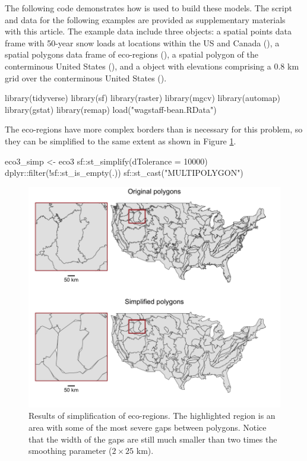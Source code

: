 The following code demonstrates how  is used to build these models. The script and data for the following examples are provided as supplementary materials with this article. The example data include three  objects: a spatial points data frame with 50-year snow loads at locations within the US and Canada (), a spatial polygons data frame of eco-regions (), a spatial polygon of the conterminous United States (), and a  object with elevations comprising a 0.8 km grid over the conterminous United States ().

\begin{example}
library(tidyverse)
library(sf)
library(raster)
library(mgcv)
library(automap)
library(gstat)
library(remap)
load("wagstaff-bean.RData")
\end{example}

The eco-regions have more complex borders than is necessary for this problem, so they can be simplified to the same extent as shown in Figure \ref{fig:simplification}.

\begin{example}
eco3_simp <- eco3 %
  sf::st_simplify(dTolerance = 10000) %
  dplyr::filter(!sf::st_is_empty(.)) %
  sf::st_cast("MULTIPOLYGON")
\end{example}

\begin{figure}[ht]
    \centering
    \includegraphics[width = \textwidth]{figures/polygon_simplification.png}
    \caption{Results of simplification of eco-regions. The highlighted region is an area with some of the most severe gaps between polygons. Notice that the width of the gaps are still much smaller than two times the smoothing parameter ($2 \times 25$ km).}
    \label{fig:simplification}
\end{figure}

